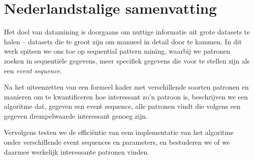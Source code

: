 \chapter{Nederlandstalige samenvatting}

Het doel van datamining is doorgaans om nuttige informatie uit grote datasets te halen -- datasets die te groot zijn om manueel in detail door te kammen. In dit werk spitsen we ons toe op sequential pattern mining, waarbij we patronen zoeken in sequentiële gegevens, meer specifiek gegevens die voor te stellen zijn als een \emph{event sequence}.

Na het uiteenzetten van een formeel kader met verschillende soorten patronen en manieren om te kwantificeren hoe interessant zo'n patroon is, beschrijven we een algoritme dat, gegeven een event sequence, alle patronen vindt die volgens een gegeven drempelwaarde interessant genoeg zijn.

Vervolgens testen we de efficiëntie van eem implementatie van het algoritme onder verschillende event sequences en parameters, en bestuderen we of we daarmee werkelijk interessante patronen vinden.
